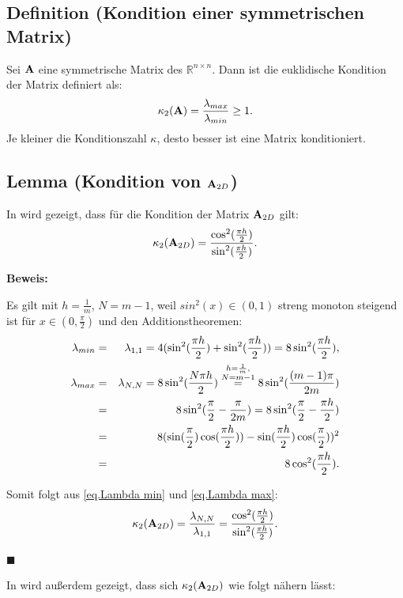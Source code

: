 \subsection{Definition (Kondition einer symmetrischen Matrix)}\label{ss.Definition Kondition einer Matrix}

Sei ${\textbf{A}}$ eine symmetrische Matrix des $\mathbb{R}^{n \times n}$. Dann ist die euklidische Kondition der Matrix definiert als:
\begin{equation}
\kappa_{2} ({\textbf{A}}) = \frac {\lambda_{max}} {\lambda_{min}} \ge 1.\label{eq.Kondition}
\end{equation}
Je kleiner die Konditionszahl $\kappa$, desto besser ist eine Matrix konditioniert.

\subsection{Lemma (Kondition von ${\textbf{A}}_{2D}$)}\label{ss.Matrixkondition}

In \cite[S. 479, Lemma 12.8.]{DR08} wird gezeigt, dass für die Kondition der Matrix ${\textbf{A}}_{2D}$ gilt:
\begin{equation}
\kappa_{2} ({\textbf{A}}_{2D}) = \frac {\cos^{2}(\frac{\pi h}{2})} {\sin^{2}(\frac{\pi h}{2})}.
\end{equation}

\textbf{Beweis:}

Es gilt mit $h = \frac{1}{m}$, $N = m - 1$, weil $sin^{2}(x) \in (0,1)$ streng monoton steigend ist für $x \in (0,\frac{\pi}{2})$ und den Additionstheoremen:
\begin{eqnarray}
\lambda_{min} &=& \lambda_{1,1} = 4 (\sin^{2}(\frac{\pi h}{2}) + \sin^{2}(\frac{\pi h}{2})) = 8\sin^{2}(\frac{\pi h}{2}),\label{eq.Lambda min}\\
\lambda_{max} &=& \lambda_{N,N} = 8\sin^{2}(\frac{N\pi h}{2}) \overset{\substack{h=\frac {1} {m}, \\N=m-1}}{=} 8\sin^{2}(\frac{(m-1)\pi}{2m}) \notag \\
&=& 8\sin^{2}(\frac{\pi}{2} - \frac{\pi}{2m}) = 8\sin^{2}(\frac{\pi}{2} - \frac{\pi h}{2}) \notag \\
&=& 8(\sin(\frac{\pi}{2})\cos(\frac{\pi h}{2})) - \sin(\frac{\pi h}{2})\cos(\frac{\pi}{2}))^{2} \notag \\
&=& 8\cos^{2}(\frac{\pi h}{2}). \label{eq.Lambda max}
\end{eqnarray}

Somit folgt aus \autoref{eq.Lambda min} und \autoref{eq.Lambda max}:
\begin{equation}
\kappa_{2} ({\textbf{A}}_{2D}) = \frac {\lambda_{N,N}} {\lambda_{1,1}} = \frac {\cos^{2} (\frac {\pi h} {2})} {\sin^{2} (\frac {\pi h} {2})}. \notag
\end{equation}
\begin{flushright}
$\blacksquare$
\end{flushright}
In \cite[S. 479, Lemma 12.8.]{DR08} wird außerdem gezeigt, dass sich $\kappa_{2}({\textbf{A}}_{2D})$ wie folgt nähern lässt:

